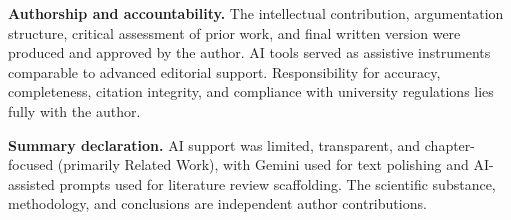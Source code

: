 \textbf{Authorship and accountability.}
The intellectual contribution, argumentation structure, critical assessment of prior work, and final written version were produced and approved by the author. AI tools served as assistive instruments comparable to advanced editorial support. Responsibility for accuracy, completeness, citation integrity, and compliance with university regulations lies fully with the author.

\textbf{Summary declaration.}
AI support was limited, transparent, and chapter-focused (primarily Related Work), with Gemini used for text polishing and AI-assisted prompts used for literature review scaffolding. The scientific substance, methodology, and conclusions are independent author contributions.
